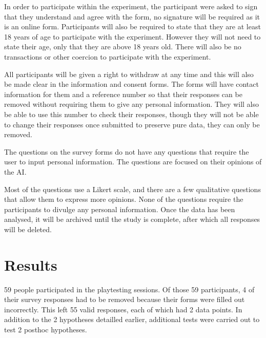 \documentclass{IEEEtran}
\begin{document}
In order to participate within the experiment, the participant were asked to sign that they understand and agree with the form, no signature will be required as it is an online form. Participants will also be required to state that they are at least 18 years of age to participate with the experiment. However they will not need to state their age, only that they are above 18 years old. There will also be no transactions or other coercion to participate with the experiment.

All participants will be given a right to withdraw at any time and this will also be made clear in the information and consent forms. The forms will have contact information for them and a reference number so that their responses can be removed without requiring them to give any personal information. They will also be able to use this number to check their responses, though they will not be able to change their responses once submitted to preserve pure data, they can only be removed.

The questions on the survey forms do not have any questions that require the user to input personal information. The questions are focused on their opinions of the AI.

Most of the questions use a Likert scale, and there are a few qualitative questions that allow them to express more opinions. None of the questions require the participants to divulge any personal information. Once the data has been analysed, it will be archived until the study is complete, after which all responses will be deleted.

\section{Results}
\label{Results}

59 people participated in the playtesting sessions. Of those 59 participants, 4 of their survey responses had to be removed because their forms were filled out incorrectly. This left 55 valid responses, each of which had 2 data points. In addition to the 2 hypotheses detailled earlier, additional tests were carried out to test 2 posthoc hypotheses.

\end{document}
